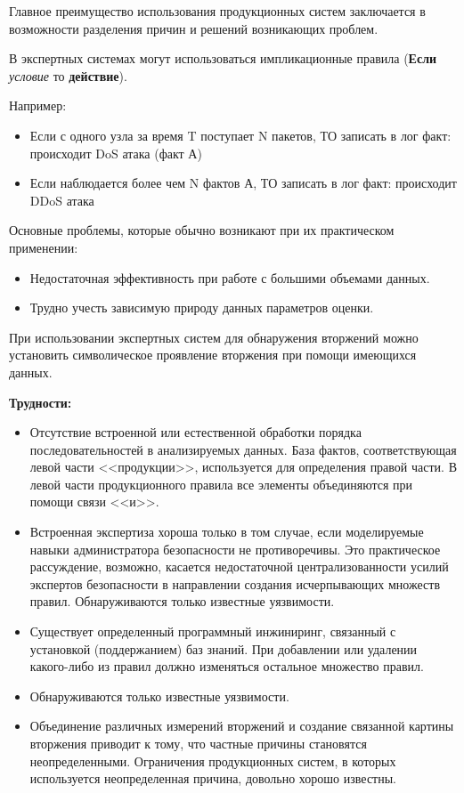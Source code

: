 Главное преимущество использования продукционных систем заключается в возможности разделения причин и
решений возникающих проблем.

В экспертных системах могут использоваться импликационные правила (\textbf{Если} \textit{условие} то
\textbf{действие}).

Например:
\begin{itemize}
	\item Если с одного узла за время T поступает N пакетов, ТО записать в лог факт:
	происходит DoS атака (факт А)

	\item Если наблюдается более чем N фактов А, ТО записать в лог факт: происходит DDoS атака
\end{itemize}

Основные проблемы, которые обычно возникают при их практическом применении:
\begin{itemize}
    \item Недостаточная эффективность при работе с большими объемами данных.
    \item Трудно учесть зависимую природу данных параметров оценки.
\end{itemize}

При использовании экспертных систем для обнаружения вторжений можно установить символическое
проявление вторжения при помощи имеющихся данных.

\textbf{Трудности:}
\begin{itemize}
    \item Отсутствие встроенной или естественной обработки порядка последовательностей в анализируемых
    данных. База фактов, соответствующая левой части <<продукции>>, используется для определения правой
    части. В левой части продукционного правила все элементы объединяются при помощи связи <<и>>.
    \item Встроенная экспертиза хороша только в том случае, если моделируемые навыки администратора
    безопасности не противоречивы. Это практическое рассуждение, возможно, касается
    недостаточной централизованности усилий экспертов безопасности в направлении создания
    исчерпывающих множеств правил. Обнаруживаются только известные уязвимости.
    \item Существует определенный программный инжиниринг, связанный с установкой (поддержанием) баз знаний.
    При добавлении или удалении какого-либо из правил должно изменяться остальное множество правил.
    \item Обнаруживаются только известные уязвимости.
    \item Объединение различных измерений вторжений и создание связанной картины вторжения приводит к
    тому, что частные причины становятся неопределенными. Ограничения продукционных систем, в
    которых используется неопределенная причина, довольно хорошо известны.
\end{itemize}

